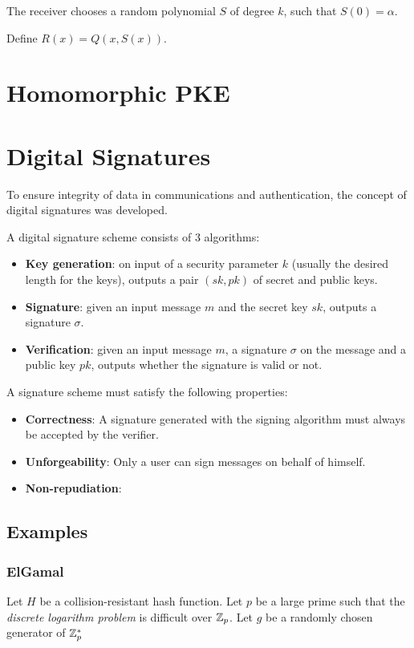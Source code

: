 The receiver chooses a random polynomial $S$ of degree $k$, such that $S(0) = \alpha$.

Define $R(x) = Q( x, S(x))$.

\cite{OPE}

\section{Homomorphic PKE}

\section{Digital Signatures}
To ensure integrity of data in communications and authentication, the concept of digital signatures was developed. 

A digital signature scheme consists of 3 algorithms:
\begin{itemize}
    \item \textbf{Key generation}: on input of a security parameter $k$ (usually the desired length for the keys), outputs a pair $(sk, pk)$ of secret and public keys.
    \item \textbf{Signature}: given an input message $m$ and the secret key $sk$, outputs a signature $\sigma$.
    \item \textbf{Verification}: given an input message $m$, a signature $\sigma$ on the message and a public key $pk$, outputs whether the signature is valid or not.
\end{itemize}

A signature scheme must satisfy the following properties:
\begin{itemize}
    \item \textbf{Correctness}: A signature generated with the signing algorithm must always be accepted by the verifier.
    \item \textbf{Unforgeability}: Only a user can sign messages on behalf of himself.
    \item \textbf{Non-repudiation}: 
\end{itemize}

\subsection{Examples}
\subsubsection*{ElGamal}
\cite{elGamal85}
Let $H$ be a collision-resistant hash function. Let $p$ be a large prime such that the \textit{discrete logarithm problem} is difficult over ${\mathbb Z}_p$. Let $g$ be a randomly chosen generator of ${\mathbb Z}_p^\ast$

